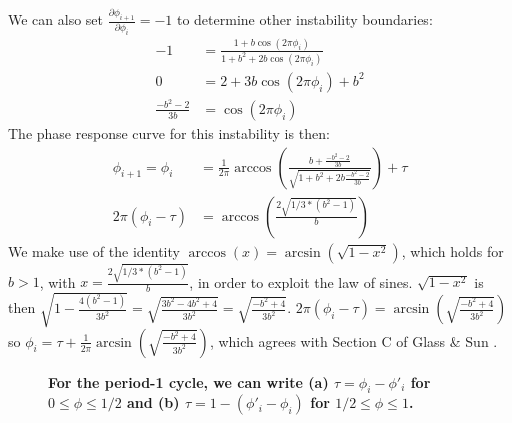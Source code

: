 \noindent We can also set $\frac{\partial \phi_{i+1}}{\partial \phi_i} = -1$ to determine other instability boundaries:
\begin{align}
    -1 &= \frac{1+b\cos(2\pi \phi_i)}{1 + b^2 + 2b\cos(2\pi \phi_i)} \nonumber \\
    0 &= 2+3b\cos(2\pi \phi_i) + b^2 \nonumber \\
    \frac{-b^2-2}{3b} &= \cos(2\pi \phi_i)
    \label{eq:square} 
\end{align}
The phase response curve for this instability is then:
\begin{align}
    \phi_{i+1} = \phi_i &= \frac{1}{2\pi}\arccos(\frac{b+\frac{-b^2-2}{3b}}{\sqrt{1+b^2+2b\frac{-b^2-2}{3b}}}) + \tau \nonumber \\
    2\pi(\phi_i - \tau) &= \arccos(\frac{2\sqrt{1/3*(b^2-1)}}{b})
\end{align} 
We make use of the identity $\arccos(x) = \arcsin(\sqrt{1-x^2})$, which holds for $b>1$, with $x = \frac{2\sqrt{1/3*(b^2-1)}}{b}$, in order to exploit the law of sines. $\sqrt{1-x^2}$ is then $\sqrt{1-\frac{4(b^2-1)}{3b^2}} = \sqrt{\frac{3b^2-4b^2+4}{3b^2}} = \sqrt{\frac{-b^2+4}{3b^2}}$. $2\pi(\phi_i - \tau) = \arcsin(\sqrt{\frac{-b^2+4}{3b^2}})$ so $\phi_i = \tau +\frac{1}{2\pi}\arcsin(\sqrt{\frac{-b^2+4}{3b^2}})$, which agrees with Section C of Glass \& Sun \supercite{GLASS1994}.

\begin{figure}[tbph]
    \medskip
    \caption{\textbf{For the period-1 cycle, we can write (a) $\tau = \phi_i - \phi'_i$ for $0\leq \phi \leq1/2$ and (b) $\tau = 1-(\phi'_i - \phi_i)$ for $1/2\leq \phi \leq1$.}}
    \label{sines}
\end{figure}

